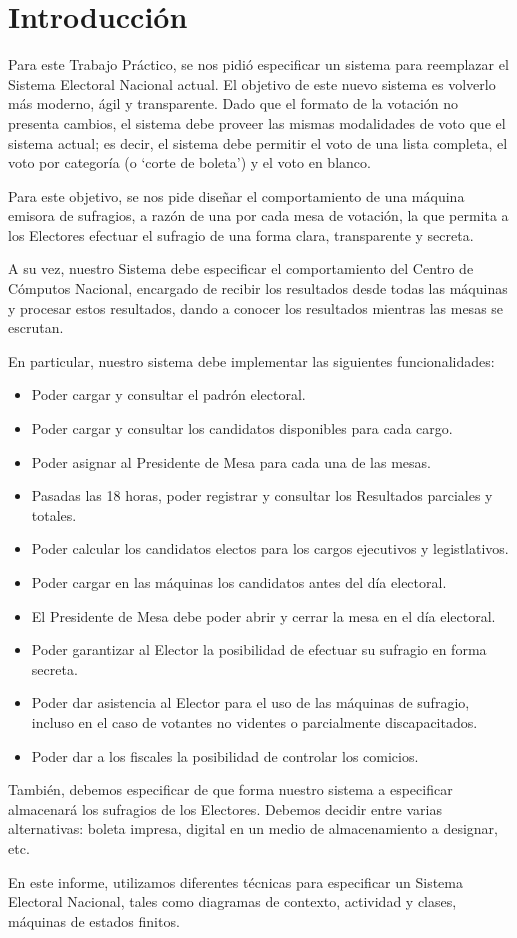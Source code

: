 \section{Introducción}

	Para este Trabajo Práctico, se nos pidió especificar un sistema para reemplazar el Sistema Electoral Nacional actual. El objetivo de este nuevo sistema es volverlo más moderno, ágil y transparente. Dado que el formato de la votación no presenta cambios, el sistema debe proveer las mismas modalidades de voto que el sistema actual; es decir, el sistema debe permitir el voto de una lista completa, el voto por categoría (o `corte de boleta') y el voto en blanco.
	
	Para este objetivo, se nos pide diseñar el comportamiento de una máquina emisora de sufragios, a razón de una por cada mesa de votación, la que permita a los Electores efectuar el sufragio de una forma clara, transparente y secreta.
	
	A su vez, nuestro Sistema debe especificar el comportamiento del Centro de Cómputos Nacional, encargado de recibir los resultados desde todas las máquinas y procesar estos resultados, dando a conocer los resultados mientras las mesas se escrutan.
	
	En particular, nuestro sistema debe implementar las siguientes funcionalidades:
\begin{itemize}
\item Poder cargar y consultar el padrón electoral.
\item Poder cargar y consultar los candidatos disponibles para cada cargo.
\item Poder asignar al Presidente de Mesa para cada una de las mesas.
\item Pasadas las 18 horas, poder registrar y consultar los Resultados parciales y totales.
\item Poder calcular los candidatos electos para los cargos ejecutivos y legistlativos.
\item Poder cargar en las máquinas los candidatos antes del día electoral.
\item El Presidente de Mesa debe poder abrir y cerrar la mesa en el día electoral.
\item Poder garantizar al Elector la posibilidad de efectuar su sufragio en forma secreta.
\item Poder dar asistencia al Elector para el uso de las máquinas de sufragio, incluso en el caso de votantes no videntes o parcialmente discapacitados.
\item Poder dar a los fiscales la posibilidad de controlar los comicios.
\end{itemize}

	También, debemos especificar de que forma nuestro sistema a especificar almacenará los sufragios de los Electores. Debemos decidir entre varias alternativas: boleta impresa, digital en un medio de almacenamiento a designar, etc.
	
	En este informe, utilizamos diferentes técnicas para especificar un Sistema Electoral Nacional, tales como diagramas de contexto, actividad y clases, máquinas de estados finitos.
